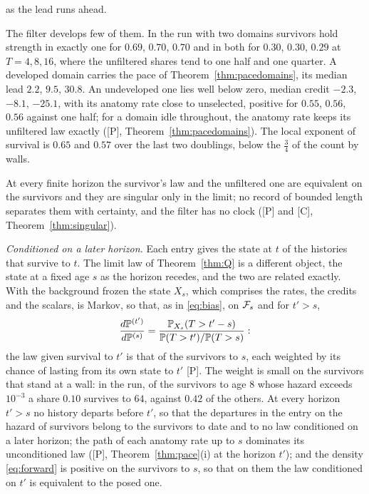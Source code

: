 \begin{description}
as the lead runs ahead.
\item[With domains.] The filter develops few of them. In the run with
two domains survivors hold strength in exactly one for $0.69$,
$0.70$, $0.70$ and in both for $0.30$, $0.30$, $0.29$ at
$T=4,8,16$, where the unfiltered shares tend to one half and one quarter.
A developed domain carries the pace of Theorem~\ref{thm:pacedomains}, its median lead
$2.2$, $9.5$, $30.8$. An undeveloped one lies well below zero,
median credit $-2.3$, $-8.1$, $-25.1$, with its anatomy rate close
to unselected, positive for $0.55$, $0.56$, $0.56$ against one
half; for a domain idle throughout, the anatomy rate keeps its unfiltered
law exactly ([P], Theorem~\ref{thm:pacedomains}). The local exponent of survival is $0.65$
and $0.57$ over the last two doublings, below the $\tfrac34$ of the
count by walls.
\item[The measure class.] At every finite horizon the survivor's law and
the unfiltered one are equivalent on the survivors and they are singular
only in the limit; no record of bounded length separates them with
certainty, and the filter has no clock ([P] and [C], Theorem~\ref{thm:singular}).
\end{description}

\emph{Conditioned on a later horizon.} Each entry gives the state at $t$
of the histories that survive to $t$. The limit law of Theorem~\ref{thm:Q} is a different object, the
state at a fixed age $s$ as the horizon recedes, and the two are related
exactly. With the background frozen the state $X_s$, which comprises the
rates, the credits and the scalars, is Markov, so that, as in \eqref{eq:bias}, on $\mathcal{F}_s$
and for $t'>s$,
\begin{equation}\label{eq:forward}
\frac{d\mathbb{P}^{(t')}}{d\mathbb{P}^{(s)}}=\frac{\mathbb{P}_{X_s}(T>t'-s)}{\mathbb{P}(T>t')/\mathbb{P}(T>s)}:
\end{equation}
the law given survival to $t'$ is that of the survivors to $s$, each
weighted by its chance of lasting from its own state to $t'$ [P]. The
weight is small on the survivors that stand at a wall: in the run, of
the survivors to age $8$ whose hazard exceeds $10^{-3}$ a share
$0.10$ survives to $64$, against $0.42$ of the others. At
every horizon $t'>s$ no history departs before $t'$, so that the
departures in the entry on the hazard of survivors belong to the
survivors to date and to no law conditioned on a later horizon; the path
of each anatomy rate up to $s$ dominates its unconditioned law ([P],
Theorem~\ref{thm:pace}(i) at the horizon $t'$); and the density \eqref{eq:forward} is positive
on the survivors to $s$, so that on them the law conditioned on $t'$ is
equivalent to the posed one.

